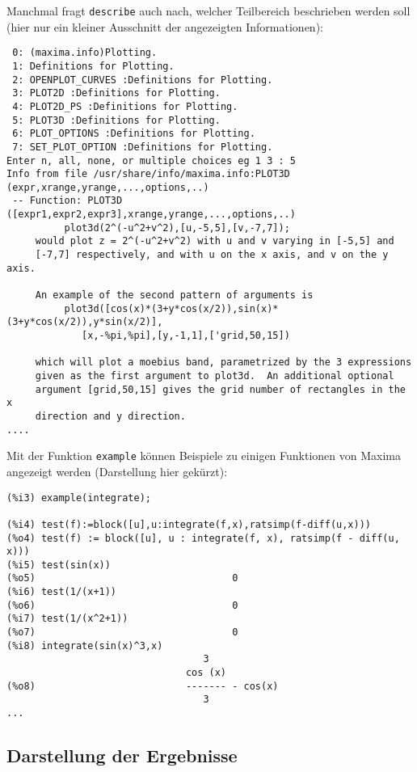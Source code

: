 \documentclass[ngerman,12pt]{scrartcl}
\begin{document}
Manchmal fragt \texttt{describe} auch nach, welcher Teilbereich
beschrieben werden soll (hier nur ein kleiner Ausschnitt der
angezeigten Informationen):

\begin{verbatim}
 0: (maxima.info)Plotting.
 1: Definitions for Plotting.
 2: OPENPLOT_CURVES :Definitions for Plotting.
 3: PLOT2D :Definitions for Plotting.
 4: PLOT2D_PS :Definitions for Plotting.
 5: PLOT3D :Definitions for Plotting.
 6: PLOT_OPTIONS :Definitions for Plotting.
 7: SET_PLOT_OPTION :Definitions for Plotting.
Enter n, all, none, or multiple choices eg 1 3 : 5
Info from file /usr/share/info/maxima.info:PLOT3D (expr,xrange,yrange,...,options,..)
 -- Function: PLOT3D ([expr1,expr2,expr3],xrange,yrange,...,options,..)
          plot3d(2^(-u^2+v^2),[u,-5,5],[v,-7,7]);
     would plot z = 2^(-u^2+v^2) with u and v varying in [-5,5] and
     [-7,7] respectively, and with u on the x axis, and v on the y axis.

     An example of the second pattern of arguments is
          plot3d([cos(x)*(3+y*cos(x/2)),sin(x)*(3+y*cos(x/2)),y*sin(x/2)],
             [x,-%pi,%pi],[y,-1,1],['grid,50,15])

     which will plot a moebius band, parametrized by the 3 expressions
     given as the first argument to plot3d.  An additional optional
     argument [grid,50,15] gives the grid number of rectangles in the x
     direction and y direction.
....
\end{verbatim}

Mit der Funktion \texttt{example} können Beispiele zu einigen
Funktionen von Maxima angezeigt werden (Darstellung hier gekürzt):

\begin{verbatim}
(%i3) example(integrate);

(%i4) test(f):=block([u],u:integrate(f,x),ratsimp(f-diff(u,x)))
(%o4) test(f) := block([u], u : integrate(f, x), ratsimp(f - diff(u, x)))
(%i5) test(sin(x))
(%o5)                                  0
(%i6) test(1/(x+1))
(%o6)                                  0
(%i7) test(1/(x^2+1))
(%o7)                                  0
(%i8) integrate(sin(x)^3,x)
                                  3
                               cos (x)
(%o8)                          ------- - cos(x)
                                  3
...
\end{verbatim}

\subsection{Darstellung der Ergebnisse}
\end{document}
